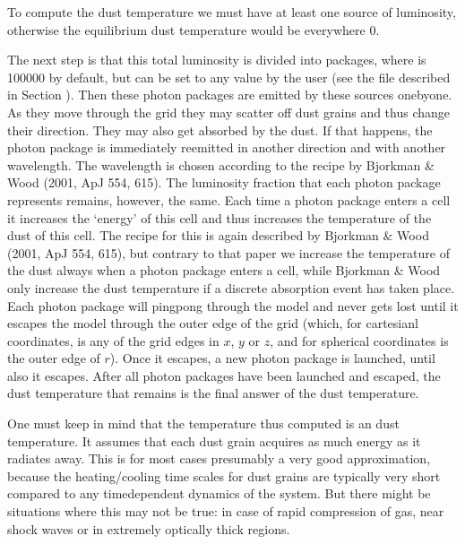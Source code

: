 \documentclass[letterpaper,10pt,english]{sphinxmanual}
\begin{document}
To compute the dust temperature we must have at least one source of luminosity,
otherwise the equilibrium dust temperature would be everywhere 0.

The next step is that this total luminosity is divided into  packages,
where  is 100000 by default, but can be set to any value by the user
(see the file  described in Section {\hyperref[\detokenize{inputoutputfiles:sec-radmc-inp}]{}}). Then
these photon packages are emitted by these sources one\sphinxhyphen{}by\sphinxhyphen{}one. As they move
through the grid they may scatter off dust grains and thus change their
direction. They may also get absorbed by the dust. If that happens, the photon
package is immediately re\sphinxhyphen{}emitted in another direction and with another
wavelength. The wavelength is chosen according to the recipe by Bjorkman \& Wood
(2001, ApJ 554, 615). The luminosity fraction that each photon package
represents remains, however, the same. Each time a photon package enters a cell
it increases the ‘energy’ of this cell and thus increases the temperature of
the dust of this cell.  The recipe for this is again described by Bjorkman \&
Wood (2001, ApJ 554, 615), but contrary to that paper we increase the
temperature of the dust always when a photon package enters a cell, while
Bjorkman \& Wood only increase the dust temperature if a discrete absorption
event has taken place. Each photon package will ping\sphinxhyphen{}pong through the model and
never gets lost until it escapes the model through the outer edge of the grid
(which, for cartesianl coordinates, is any of the grid edges in \(x\),
\(y\) or \(z\), and for spherical coordinates is the outer edge of
\(r\)). Once it escapes, a new photon package is launched, until also it
escapes. After all photon packages have been launched and escaped, the dust
temperature that remains is the final answer of the dust temperature.

One must keep in mind that the temperature thus computed is an 
dust temperature. It assumes that each dust grain acquires as much energy as it
radiates away. This is for most cases presumably a very good approximation,
because the heating/cooling time scales for dust grains are typically very short
compared to any time\sphinxhyphen{}dependent dynamics of the system. But there might be
situations where this may not be true: in case of rapid compression of gas, near
shock waves or in extremely optically thick regions.
\end{document}

